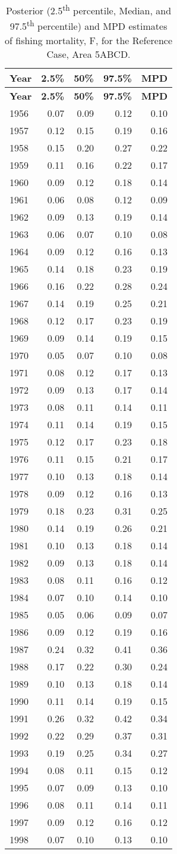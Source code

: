 \documentclass[11pt]{book}
\begin{document}
\begin{longtable}[]{@{}lrrrr@{}}
\caption{\label{tab:tab-post-f-5abcd}Posterior (2.5\textsuperscript{th} percentile, Median, and 97.5\textsuperscript{th} percentile) and MPD estimates of fishing mortality, F, for the Reference Case, Area 5ABCD.}\tabularnewline
\toprule
\textbf{Year} & \textbf{2.5\%} & \textbf{50\%} & \textbf{97.5\%} & \textbf{MPD}\tabularnewline
\midrule
\endfirsthead
\toprule
\textbf{Year} & \textbf{2.5\%} & \textbf{50\%} & \textbf{97.5\%} & \textbf{MPD}\tabularnewline
\midrule
\endhead
1956 & 0.07 & 0.09 & 0.12 & 0.10\tabularnewline
1957 & 0.12 & 0.15 & 0.19 & 0.16\tabularnewline
1958 & 0.15 & 0.20 & 0.27 & 0.22\tabularnewline
1959 & 0.11 & 0.16 & 0.22 & 0.17\tabularnewline
1960 & 0.09 & 0.12 & 0.18 & 0.14\tabularnewline
1961 & 0.06 & 0.08 & 0.12 & 0.09\tabularnewline
1962 & 0.09 & 0.13 & 0.19 & 0.14\tabularnewline
1963 & 0.06 & 0.07 & 0.10 & 0.08\tabularnewline
1964 & 0.09 & 0.12 & 0.16 & 0.13\tabularnewline
1965 & 0.14 & 0.18 & 0.23 & 0.19\tabularnewline
1966 & 0.16 & 0.22 & 0.28 & 0.24\tabularnewline
1967 & 0.14 & 0.19 & 0.25 & 0.21\tabularnewline
1968 & 0.12 & 0.17 & 0.23 & 0.19\tabularnewline
1969 & 0.09 & 0.14 & 0.19 & 0.15\tabularnewline
1970 & 0.05 & 0.07 & 0.10 & 0.08\tabularnewline
1971 & 0.08 & 0.12 & 0.17 & 0.13\tabularnewline
1972 & 0.09 & 0.13 & 0.17 & 0.14\tabularnewline
1973 & 0.08 & 0.11 & 0.14 & 0.11\tabularnewline
1974 & 0.11 & 0.14 & 0.19 & 0.15\tabularnewline
1975 & 0.12 & 0.17 & 0.23 & 0.18\tabularnewline
1976 & 0.11 & 0.15 & 0.21 & 0.17\tabularnewline
1977 & 0.10 & 0.13 & 0.18 & 0.14\tabularnewline
1978 & 0.09 & 0.12 & 0.16 & 0.13\tabularnewline
1979 & 0.18 & 0.23 & 0.31 & 0.25\tabularnewline
1980 & 0.14 & 0.19 & 0.26 & 0.21\tabularnewline
1981 & 0.10 & 0.13 & 0.18 & 0.14\tabularnewline
1982 & 0.09 & 0.13 & 0.18 & 0.14\tabularnewline
1983 & 0.08 & 0.11 & 0.16 & 0.12\tabularnewline
1984 & 0.07 & 0.10 & 0.14 & 0.10\tabularnewline
1985 & 0.05 & 0.06 & 0.09 & 0.07\tabularnewline
1986 & 0.09 & 0.12 & 0.19 & 0.16\tabularnewline
1987 & 0.24 & 0.32 & 0.41 & 0.36\tabularnewline
1988 & 0.17 & 0.22 & 0.30 & 0.24\tabularnewline
1989 & 0.10 & 0.13 & 0.18 & 0.14\tabularnewline
1990 & 0.11 & 0.14 & 0.19 & 0.15\tabularnewline
1991 & 0.26 & 0.32 & 0.42 & 0.34\tabularnewline
1992 & 0.22 & 0.29 & 0.37 & 0.31\tabularnewline
1993 & 0.19 & 0.25 & 0.34 & 0.27\tabularnewline
1994 & 0.08 & 0.11 & 0.15 & 0.12\tabularnewline
1995 & 0.07 & 0.09 & 0.13 & 0.10\tabularnewline
1996 & 0.08 & 0.11 & 0.14 & 0.11\tabularnewline
1997 & 0.09 & 0.12 & 0.16 & 0.12\tabularnewline
1998 & 0.07 & 0.10 & 0.13 & 0.10\tabularnewline

\end{longtable}
\end{document}
